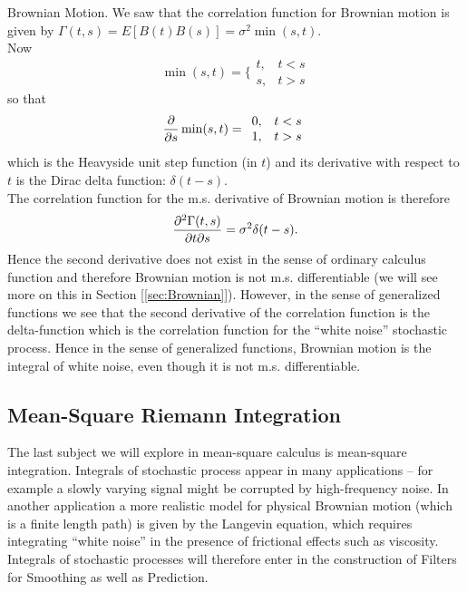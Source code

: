 \begin{example}Brownian Motion. We saw that the correlation function for Brownian motion is given by $\Gamma(t,s) = E[ B(t) B(s)] = \sigma^2 \min(s,t)$. \\

Now 
$$
\min(s,t) = \Big\{
\begin{array}{cc}
t, & t < s \\
s, & t > s
\end{array}
$$so that 
$${\partial\over \partial s} \min(s,t) = 
\begin{array}{cc}
0, & t < s \\
1, & t > s
\end{array}$$which is the Heavyside unit step function (in $t$) and its derivative with respect to $t$ is the Dirac delta function: $\delta(t - s)$. \\

The correlation function for the m.s. derivative of Brownian motion is therefore 
$${\partial^2 \Gamma(t,s) \over \partial t \partial s}  = \sigma^2 \delta( t-s ).$$ Hence the second derivative does not exist in the sense of ordinary calculus function and therefore Brownian motion is not m.s. differentiable (we will see more on this in Section [\ref{sec:Brownian}]). However, in the sense of {\elevenit generalized functions}\/ we see that the second derivative of the correlation function is the delta-function which is the correlation function for the ``white noise'' stochastic process. Hence in the sense of generalized functions, Brownian motion is the integral of white noise, even though it is not m.s. differentiable. 
\demo\end{example}

\subsection{Mean-Square Riemann Integration}

The last subject we will explore in mean-square calculus is mean-square integration. Integrals of stochastic process appear in many applications -- for example a slowly varying signal might be corrupted by high-frequency noise. In another application a more realistic model for physical Brownian motion (which is a finite length path) is given by the Langevin equation\cite{Sjogren},\cite{CalTech} which requires integrating ``white noise'' in the presence of frictional effects such as viscosity. Integrals of stochastic processes will therefore enter in the construction of {\elevenit Filters}\/ for {\elevenit Smoothing} as well as {\elevenit Prediction}.\\%

